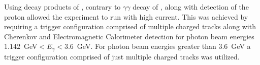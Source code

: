 Using \epem decay products of \piz, contrary to $\gamma\gamma$ decay of \piz, along with detection of the proton allowed the experiment to run with high current. This was achieved by requiring a trigger configuration comprised of multiple charged tracks along with Cherenkov and Electromagnetic Calorimeter detection for photon beam energies $1.142$~GeV$ < E_{\gamma} < 3.6$~GeV. For photon beam energies greater than $3.6$~GeV a trigger configuration comprised of just multiple charged tracks was utilized.
\FloatBarrier
%
%
%
%




%
